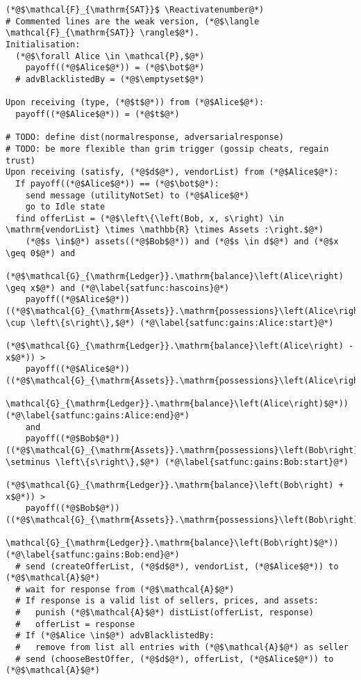 \Suppressnumber
\begin{lstlisting}[label=satfunc, style=numbers]
(*@$\mathcal{F}_{\mathrm{SAT}}$ \Reactivatenumber@*)
# Commented lines are the weak version, (*@$\langle \mathcal{F}_{\mathrm{SAT}} \rangle$@*).
Initialisation:
  (*@$\forall Alice \in \mathcal{P},$@*)
    payoff((*@$Alice$@*)) = (*@$\bot$@*)
  # advBlacklistedBy = (*@$\emptyset$@*)

Upon receiving (type, (*@$t$@*)) from (*@$Alice$@*):
  payoff((*@$Alice$@*)) = (*@$t$@*)

# TODO: define dist(normalresponse, adversarialresponse)
# TODO: be more flexible than grim trigger (gossip cheats, regain trust)
Upon receiving (satisfy, (*@$d$@*), vendorList) from (*@$Alice$@*):
  If payoff((*@$Alice$@*)) == (*@$\bot$@*):
    send message (utilityNotSet) to (*@$Alice$@*)
    go to Idle state
  find offerList = (*@$\left\{\left(Bob, x, s\right) \in \mathrm{vendorList} \times \mathbb{R} \times Assets :\right.$@*)
    (*@$s \in$@*) assets((*@$Bob$@*)) and (*@$s \in d$@*) and (*@$x \geq 0$@*) and
    (*@$\mathcal{G}_{\mathrm{Ledger}}.\mathrm{balance}\left(Alice\right) \geq x$@*) and (*@\label{satfunc:hascoins}@*)
    payoff((*@$Alice$@*))((*@$\mathcal{G}_{\mathrm{Assets}}.\mathrm{possessions}\left(Alice\right) \cup \left\{s\right\},$@*) (*@\label{satfunc:gains:Alice:start}@*)
        (*@$\mathcal{G}_{\mathrm{Ledger}}.\mathrm{balance}\left(Alice\right) - x$@*)) >
    payoff((*@$Alice$@*))((*@$\mathcal{G}_{\mathrm{Assets}}.\mathrm{possessions}\left(Alice\right),
    \mathcal{G}_{\mathrm{Ledger}}.\mathrm{balance}\left(Alice\right)$@*)) (*@\label{satfunc:gains:Alice:end}@*)
    and
    payoff((*@$Bob$@*))((*@$\mathcal{G}_{\mathrm{Assets}}.\mathrm{possessions}\left(Bob\right) \setminus \left\{s\right\},$@*) (*@\label{satfunc:gains:Bob:start}@*)
        (*@$\mathcal{G}_{\mathrm{Ledger}}.\mathrm{balance}\left(Bob\right) + x$@*)) >
    payoff((*@$Bob$@*))((*@$\mathcal{G}_{\mathrm{Assets}}.\mathrm{possessions}\left(Bob\right),
    \mathcal{G}_{\mathrm{Ledger}}.\mathrm{balance}\left(Bob\right)$@*)) (*@\label{satfunc:gains:Bob:end}@*)
  # send (createOfferList, (*@$d$@*), vendorList, (*@$Alice$@*)) to (*@$\mathcal{A}$@*)
  # wait for response from (*@$\mathcal{A}$@*)
  # If response is a valid list of sellers, prices, and assets:
  #   punish (*@$\mathcal{A}$@*) distList(offerList, response)
  #   offerList = response
  # If (*@$Alice \in$@*) advBlacklistedBy:
  #   remove from list all entries with (*@$\mathcal{A}$@*) as seller
  # send (chooseBestOffer, (*@$d$@*), offerList, (*@$Alice$@*)) to (*@$\mathcal{A}$@*)

\end{lstlisting}
